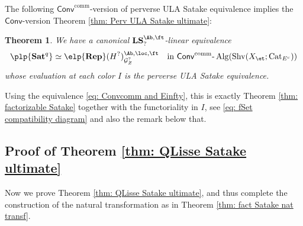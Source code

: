 \documentclass[10pt]{amsart}
\newcommand{\sssec}{\subsubsection}
\newtheorem{thm}[subsubsection]{Theorem}
\theoremstyle{remark}
\newcommand{\te}{\text}
\newcommand{\on}{\operatorname}
\newcommand{\cG}{\mathcal{G}}
\newcommand{\Cat}{\on{Cat}}
\newcommand{\CatEc}{\Cat_{E^c}}
\newcommand{\lAlg}{\text{-}\on{Alg}}
\newcommand{\Shv}{\on{Shv}}
\newcommand{\Conv}{\mathsf{Conv}}
\newcommand{\Convcomm}{\mathsf{Conv}^{\on{comm}}}
\begin{document}
    \sssec{}
    The following $\Convcomm$-version of perverse ULA Satake equivalence implies the $\Conv$-version Theorem \ref{thm: Perv ULA Satake ultimate}:
    \begin{thm}\label{thm: Perv ULA Satake Convcomm}
        We have a canonical $\mathbf{LS}^{\Ab,\ft}_{?}$-linear equivalence
        \begin{equation}\label{eq: equiv as Convcomm algs}
            \plp{\mathbf{Sat}^q}\simeq \elp{\mathbf{Rep}}(H^?)^{\Ab,\loc,\ft}_{\cG^{?}_Z}\quad \te{in} \ \Convcomm\lAlg(\Shv(X_{\et};\CatEc))
        \end{equation}
         whose evaluation at each color $I$ is the perverse ULA Satake equivalence.
    \end{thm} 

    Using the equivalence \eqref{eq: Convcomm and Einfty}, this is exactly Theorem \ref{thm: factorizable Satake} together with the functoriality in $I$, see \eqref{eq: fSet compatibility diagram} and also the remark below that.
    
    


    \subsection{Proof of Theorem \ref{thm: QLisse Satake ultimate}}\label{ssec: proof of QLisse ultimate}
    Now we prove Theorem \ref{thm: QLisse Satake ultimate}, and thus complete the construction of the natural transformation as in Theorem \ref{thm: fact Satake nat transf}.
\end{document}
